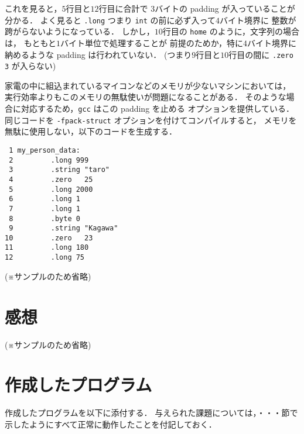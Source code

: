 \documentclass[a4j,11pt]{jarticle}
\begin{document}
これを見ると，$5$行目と$12$行目に合計で
$3$バイトの padding が入っていることが分かる．
よく見ると \verb|.long| つまり \verb|int| の前に必ず入って$4$バイト境界に
整数が跨がらないようになっている．
しかし，$10$行目の \verb|home| のように，文字列の場合は，
もともと$1$バイト単位で処理することが
前提のためか，特に$4$バイト境界に納めるような padding は行われていない．
(つまり$9$行目と$10$行目の間に \verb|.zero 3| が入らない)

家電の中に組込まれているマイコンなどのメモリが少ないマシンにおいては，
実行効率よりもこのメモリの無駄使いが問題になることがある．
そのような場合に対応するため，\verb|gcc| はこの padding を止める
オプションを提供している．
同じコードを \verb|-fpack-struct| オプションを付けてコンパイルすると，
メモリを無駄に使用しない，以下のコードを生成する．

{\fontsize{10pt}{11pt} \selectfont
\begin{verbatim}
 1 my_person_data:
 2         .long 999
 3         .string "taro"
 4         .zero   25
 5         .long 2000
 6         .long 1
 7         .long 1
 8         .byte 0
 9         .string "Kagawa"
10         .zero   23
11         .long 180
12         .long 75
\end{verbatim}
}

(※サンプルのため省略)

\section{感想}

(※サンプルのため省略)

\section{作成したプログラム}

作成したプログラムを以下に添付する．
与えられた課題については，・・・節で示したようにすべて正常に動作したことを付記しておく．
\end{document}
